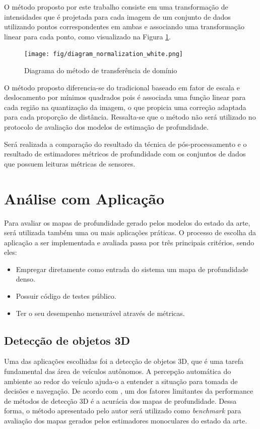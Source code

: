 O método proposto por este trabalho consiste em uma transformação de intensidades que é projetada para cada imagem de um conjunto de dados utilizando pontos correspondentes em ambas e associando uma transformação linear para cada ponto, como visualizado na Figura \ref{posproc}. 


\begin{figure}[h]
    \centering
    \texttt{[image: fig/diagram\_normalization\_white.png]}
    \caption{Diagrama do método de transferência de domínio}
    \label{posproc}
\end{figure}

O método proposto diferencia-se do tradicional baseado em fator de escala e deslocamento por mínimos quadrados pois é associada uma função linear para cada região na quantização da imagem, o que propicia uma correção adaptada para cada proporção de distância. Ressalta-se que o método não será utilizado no protocolo de avaliação dos modelos de estimação de profundidade.

Será realizada a comparação do resultado da técnica de pós-processamento e o resultado de estimadores métricos de profundidade com os conjuntos de dados que possuem leituras métricas de sensores.


\section{Análise com Aplicação}

Para avaliar os mapas de profundidade gerado pelos modelos do estado da arte, será utilizada também uma ou mais aplicações práticas. O processo de escolha da aplicação a ser implementada e avaliada passa por três principais critérios, sendo eles: 

\begin{itemize}
    \item Empregar diretamente como entrada do sistema um mapa de profundidade denso.
    \item Possuir código de testes público.
    \item Ter o seu desempenho mensurável através de métricas. 
\end{itemize}

\subsection{Detecção de objetos 3D}

Uma das aplicações escolhidas foi a detecção de objetos 3D, que é uma tarefa fundamental das área de veículos autônomos. A percepção automática do ambiente ao redor do veículo ajuda-o a entender a situação para tomada de decisões e navegação. De acordo com , um dos fatores limitantes da performance de métodos de detecção 3D é a acurácia dos mapas de profundidade. Dessa forma, o método apresentado pelo autor será utilizado como \textit{benchmark} para avaliação dos mapas gerados pelos estimadores monoculares do estado da arte.

